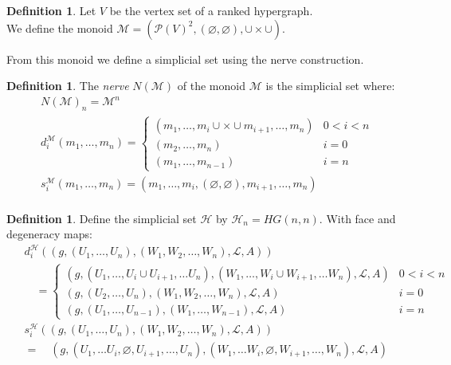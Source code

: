 \documentclass[12pt]{article}
\theoremstyle{definition}
\newtheorem{definition}[theorem]{Definition}
\renewcommand{\P}{\mathcal{P}}
\newcommand{\1}{\mathbbm{1}}
\renewcommand{\L}{\mathcal{L}}
\newcommand{\M}{\mathcal{M}}
\renewcommand{\H}{\mathcal{H}}
\begin{document}
\begin{definition}
    Let $V$ be the vertex set of a ranked hypergraph.\\
    We define the monoid $\M = (\P(V)^2, (\varnothing, \varnothing), \cup\times\cup)$. 
\end{definition}

From this monoid we define a simplicial set using the nerve construction.

\begin{definition}
    The \emph{nerve} $N(\M)$ of the monoid $\M$ is the simplicial set where:
    \begin{align*}
        N(\M)_n = \M^n\\
        d^{\M}_i(m_1,\dots,m_n) = 
        \begin{cases}
            (m_1,\dots,m_i \cup\times\cup m_{i+1}, \dots, m_n) & 0 < i < n\\
            (m_2,\dots, m_n) & i = 0\\
            (m_1,\dots,m_{n-1}) & i = n
        \end{cases}\\
        s^{\M}_i(m_1,\dots,m_n) = (m_1, \dots, m_i, (\varnothing, \varnothing), m_{i+1}, \dots, m_n)\\
    \end{align*}
\end{definition}

\begin{definition}
Define the simplicial set $\H$ by $\H_n = HG(n,n)$. With face and degeneracy maps:
\begin{align*}
    &d_i^{\H} ((g, (U_1, \dots, U_n), (W_1, W_2, \dots, W_n), \L, A))\\
    &\quad=\begin{cases}
        (g, (U_1, \dots, U_i\cup U_{i+1}, \dots U_n), (W_1, \dots, W_i\cup W_{i+1}, \dots W_n), \L, A) & 0 < i < n\\
        (g, (U_2, \dots, U_n), (W_1, W_2, \dots, W_n), \L, A) & i = 0\\
        (g, (U_1, \dots, U_{n-1}), (W_1, \dots, W_{n-1}), \L, A) & i = n
    \end{cases}\\
    \hspace{5pt}
    &s_i^{\H}((g, (U_1, \dots, U_n), (W_1, W_2, \dots, W_n), \L, A))\\
    &=\quad (g, (U_1, \dots U_i, \varnothing, U_{i+1}, \dots, U_n), (W_1, \dots W_i, \varnothing, W_{i+1}, \dots, W_n), \L, A)
\end{align*}
\end{definition}
\end{document}
